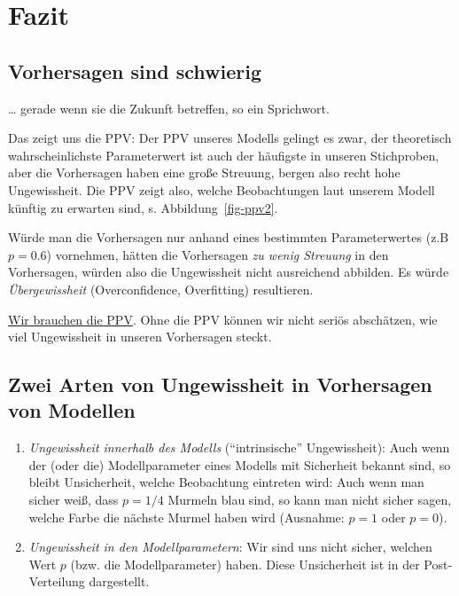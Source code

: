 \documentclass[
  a4paper,
  DIV=11]{scrreprt}
\theoremstyle{definition}
\theoremstyle{remark}
\begin{document}
\hypertarget{fazit-1}{%
\section{Fazit}\label{fazit-1}}

\hypertarget{vorhersagen-sind-schwierig}{%
\subsection{Vorhersagen sind
schwierig}\label{vorhersagen-sind-schwierig}}

\ldots{} gerade wenn sie die Zukunft betreffen, so ein Sprichwort.

Das zeigt uns die PPV: Der PPV unseres Modells gelingt es zwar, der
theoretisch wahrscheinlichste Parameterwert ist auch der häufigste in
unseren Stichproben, aber die Vorhersagen haben eine große Streuung,
bergen also recht hohe Ungewissheit. Die PPV zeigt also, welche
Beobachtungen laut unserem Modell künftig zu erwarten sind, s.
Abbildung~\ref{fig-ppv2}.

Würde man die Vorhersagen nur anhand eines bestimmten Parameterwertes
(z.B \(p=0.6\)) vornehmen, hätten die Vorhersagen \emph{zu wenig
Streuung} in den Vorhersagen, würden also die Ungewissheit nicht
ausreichend abbilden. Es würde \emph{Übergewissheit} (Overconfidence,
Overfitting) resultieren.

\href{https://imgflip.com/i/6zm1hh}{Wir brauchen die PPV}. Ohne die PPV
können wir nicht seriös abschätzen, wie viel Ungewissheit in unseren
Vorhersagen steckt.

\hypertarget{zwei-arten-von-ungewissheit-in-vorhersagen-von-modellen}{%
\subsection{Zwei Arten von Ungewissheit in Vorhersagen von
Modellen}\label{zwei-arten-von-ungewissheit-in-vorhersagen-von-modellen}}

\begin{enumerate}
\def\labelenumi{\arabic{enumi}.}
\item
  \emph{Ungewissheit innerhalb des Modells} (``intrinsische''
  Ungewissheit): Auch wenn der (oder die) Modellparameter eines Modells
  mit Sicherheit bekannt sind, so bleibt Unsicherheit, welche
  Beobachtung eintreten wird: Auch wenn man sicher weiß, dass \(p=1/4\)
  Murmeln blau sind, so kann man nicht sicher sagen, welche Farbe die
  nächste Murmel haben wird (Ausnahme: \(p=1\) oder \(p=0\)).
\item
  \emph{Ungewissheit in den Modellparametern}: Wir sind uns nicht
  sicher, welchen Wert \(p\) (bzw. die Modellparameter) haben. Diese
  Unsicherheit ist in der Post-Verteilung dargestellt.
\end{enumerate}
\end{document}
